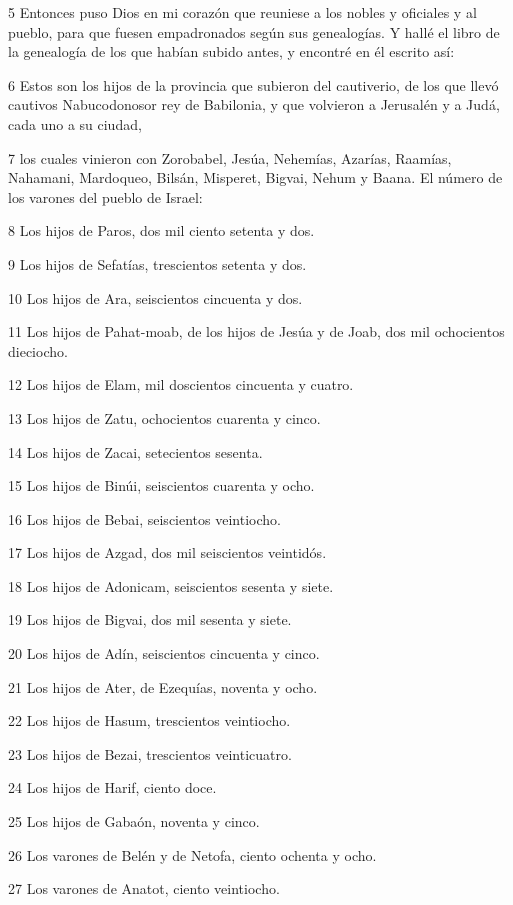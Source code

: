 \par 5 Entonces puso Dios en mi corazón que reuniese a los nobles y oficiales y al pueblo, para que fuesen empadronados según sus genealogías. Y hallé el libro de la genealogía de los que habían subido antes, y encontré en él escrito así:
\par 6 Estos son los hijos de la provincia que subieron del cautiverio, de los que llevó cautivos Nabucodonosor rey de Babilonia, y que volvieron a Jerusalén y a Judá, cada uno a su ciudad,
\par 7 los cuales vinieron con Zorobabel, Jesúa, Nehemías, Azarías, Raamías, Nahamani, Mardoqueo, Bilsán, Misperet, Bigvai, Nehum y Baana. El número de los varones del pueblo de Israel:
\par 8 Los hijos de Paros, dos mil ciento setenta y dos.
\par 9 Los hijos de Sefatías, trescientos setenta y dos.
\par 10 Los hijos de Ara, seiscientos cincuenta y dos.
\par 11 Los hijos de Pahat-moab, de los hijos de Jesúa y de Joab, dos mil ochocientos dieciocho.
\par 12 Los hijos de Elam, mil doscientos cincuenta y cuatro.
\par 13 Los hijos de Zatu, ochocientos cuarenta y cinco.
\par 14 Los hijos de Zacai, setecientos sesenta.
\par 15 Los hijos de Binúi, seiscientos cuarenta y ocho.
\par 16 Los hijos de Bebai, seiscientos veintiocho.
\par 17 Los hijos de Azgad, dos mil seiscientos veintidós.
\par 18 Los hijos de Adonicam, seiscientos sesenta y siete.
\par 19 Los hijos de Bigvai, dos mil sesenta y siete.
\par 20 Los hijos de Adín, seiscientos cincuenta y cinco.
\par 21 Los hijos de Ater, de Ezequías, noventa y ocho.
\par 22 Los hijos de Hasum, trescientos veintiocho.
\par 23 Los hijos de Bezai, trescientos veinticuatro.
\par 24 Los hijos de Harif, ciento doce.
\par 25 Los hijos de Gabaón, noventa y cinco.
\par 26 Los varones de Belén y de Netofa, ciento ochenta y ocho.
\par 27 Los varones de Anatot, ciento veintiocho.

